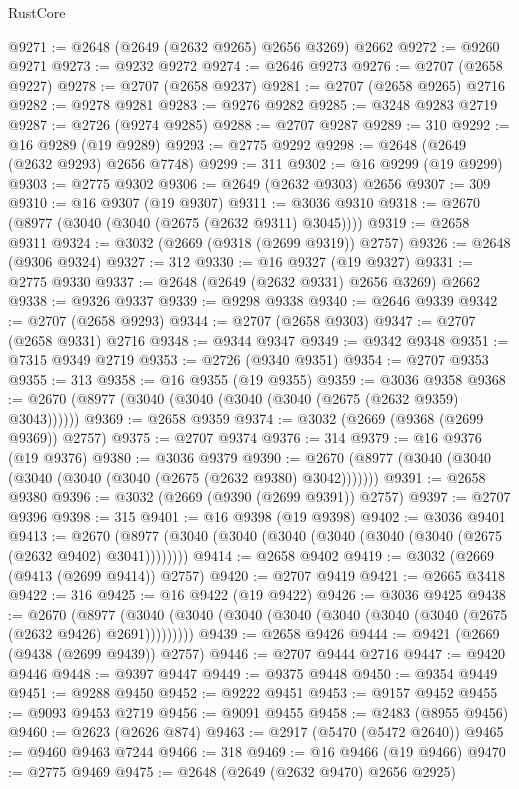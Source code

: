 \begin{lexlean}{RustCore}
\begin{coremodule}
@9271 := @2648 (@2649 (@2632 @9265) @2656 @3269) @2662
@9272 := @9260 @9271
@9273 := @9232 @9272
@9274 := @2646 @9273
@9276 := @2707 (@2658 @9227)
@9278 := @2707 (@2658 @9237)
@9281 := @2707 (@2658 @9265) @2716
@9282 := @9278 @9281
@9283 := @9276 @9282
@9285 := @3248 @9283 @2719
@9287 := @2726 (@9274 @9285)
@9288 := @2707 @9287
@9289 := 310
@9292 := @16 @9289 (@19 @9289)
@9293 := @2775 @9292
@9298 := @2648 (@2649 (@2632 @9293) @2656 @7748)
@9299 := 311
@9302 := @16 @9299 (@19 @9299)
@9303 := @2775 @9302
@9306 := @2649 (@2632 @9303) @2656
@9307 := 309
@9310 := @16 @9307 (@19 @9307)
@9311 := @3036 @9310
@9318 := @2670 (@8977 (@3040 (@3040 (@2675 (@2632 @9311) @3045))))
@9319 := @2658 @9311
@9324 := @3032 (@2669 (@9318 (@2699 @9319)) @2757)
@9326 := @2648 (@9306 @9324)
@9327 := 312
@9330 := @16 @9327 (@19 @9327)
@9331 := @2775 @9330
@9337 := @2648 (@2649 (@2632 @9331) @2656 @3269) @2662
@9338 := @9326 @9337
@9339 := @9298 @9338
@9340 := @2646 @9339
@9342 := @2707 (@2658 @9293)
@9344 := @2707 (@2658 @9303)
@9347 := @2707 (@2658 @9331) @2716
@9348 := @9344 @9347
@9349 := @9342 @9348
@9351 := @7315 @9349 @2719
@9353 := @2726 (@9340 @9351)
@9354 := @2707 @9353
@9355 := 313
@9358 := @16 @9355 (@19 @9355)
@9359 := @3036 @9358
@9368 := @2670 (@8977 (@3040 (@3040 (@3040 (@3040 (@2675 (@2632 @9359) @3043))))))
@9369 := @2658 @9359
@9374 := @3032 (@2669 (@9368 (@2699 @9369)) @2757)
@9375 := @2707 @9374
@9376 := 314
@9379 := @16 @9376 (@19 @9376)
@9380 := @3036 @9379
@9390 := @2670 (@8977 (@3040 (@3040 (@3040 (@3040 (@3040 (@2675 (@2632 @9380) @3042)))))))
@9391 := @2658 @9380
@9396 := @3032 (@2669 (@9390 (@2699 @9391)) @2757)
@9397 := @2707 @9396
@9398 := 315
@9401 := @16 @9398 (@19 @9398)
@9402 := @3036 @9401
@9413 := @2670 (@8977 (@3040 (@3040 (@3040 (@3040 (@3040 (@3040 (@2675 (@2632 @9402) @3041))))))))
@9414 := @2658 @9402
@9419 := @3032 (@2669 (@9413 (@2699 @9414)) @2757)
@9420 := @2707 @9419
@9421 := @2665 @3418
@9422 := 316
@9425 := @16 @9422 (@19 @9422)
@9426 := @3036 @9425
@9438 := @2670
    (@8977 (@3040 (@3040 (@3040 (@3040 (@3040 (@3040 (@3040 (@2675 (@2632 @9426) @2691)))))))))
@9439 := @2658 @9426
@9444 := @9421 (@2669 (@9438 (@2699 @9439)) @2757)
@9446 := @2707 @9444 @2716
@9447 := @9420 @9446
@9448 := @9397 @9447
@9449 := @9375 @9448
@9450 := @9354 @9449
@9451 := @9288 @9450
@9452 := @9222 @9451
@9453 := @9157 @9452
@9455 := @9093 @9453 @2719
@9456 := @9091 @9455
@9458 := @2483 (@8955 @9456)
@9460 := @2623 (@2626 @874)
@9463 := @2917 (@5470 (@5472 @2640))
@9465 := @9460 @9463 @7244
@9466 := 318
@9469 := @16 @9466 (@19 @9466)
@9470 := @2775 @9469
@9475 := @2648 (@2649 (@2632 @9470) @2656 @2925)

\end{coremodule}
\end{lexlean}
